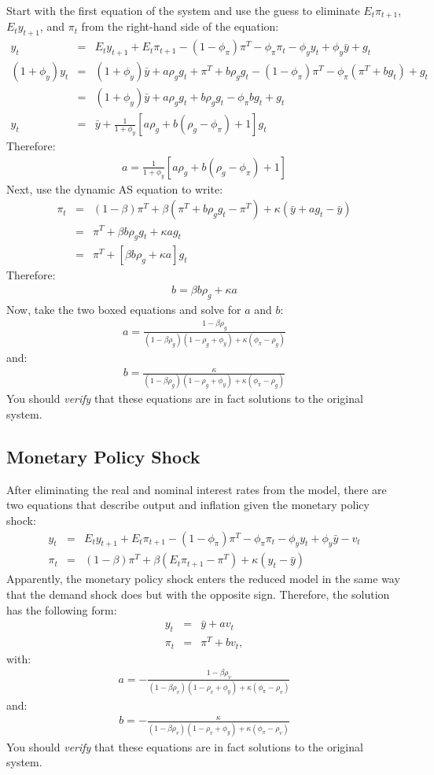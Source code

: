 \documentclass[12pt,fleqn]{article}
\newcommand{\EE}{\begin{eqnarray}}
\newcommand{\FF}{\end{eqnarray}}
\begin{document}
\begin{appendix}
Start with the first equation of the system and use the guess to eliminate $E_t\pi_{t+1}$, $E_ty_{t+1}$, and $\pi_t$ from the right-hand side of the equation:
	\EE
	y_t & = & E_t y_{t+1} + E_t\pi_{t+1}  - (1-\phi_{\pi})\pi^T - \phi_{\pi}\pi_t - \phi_y y_t + \phi_y \bar{y} +  g_t\\
	(1+\phi_y ) y_t & = & (1+\phi_y ) \bar{y} + a \rho_gg_t + \pi^T + b \rho_gg_t - (1-\phi_{\pi})\pi^T - \phi_{\pi}( \pi^T + b g_t) + g_t\\
	& = & (1+\phi_y )\bar{y} + a \rho_gg_t + b \rho_gg_t - \phi_{\pi}b g_t + g_t\\
	y_t & = & \bar{y} + \frac{1}{1+\phi_y }\left[a \rho_g + b (\rho_g - \phi_{\pi}) + 1\right]g_t
	\FF
Therefore:
	\EE
	\boxed{a  =  \frac{1}{1+\phi_y }\left[a \rho_g + b (\rho_g - \phi_{\pi}) + 1\right]}
	\FF
Next, use the dynamic AS equation to write:
	\EE
	\pi_t & = & (1-\beta) \pi^T + \beta \left( \pi^T + b \rho_gg_t - \pi^T\right)  + \kappa (\bar{y} + a g_t -\bar{y})\\
	& = & \pi^T + \beta b \rho_gg_t + \kappa a g_t\\
	& = & \pi^T + \left[ \beta b \rho_g + \kappa a \right]g_t
	\FF
Therefore:
	\EE
	\boxed{b = \beta b \rho_g + \kappa a}
	\FF
Now, take the two boxed equations and solve for $a$ and $b$:
	\EE
	\boxed{a = \frac{1-\beta\rho_g}{(1-\beta\rho_g)(1-\rho_g+\phi_y)+ \kappa(\phi_{\pi}-\rho_g)} }
	\FF
	and:
	\EE
	\boxed{b = \frac{\kappa}{(1-\beta\rho_g)(1-\rho_g+\phi_y)+ \kappa(\phi_{\pi}-\rho_g)}}
	\FF
You should \emph{verify} that these equations are in fact solutions to the original system.

\subsection{Monetary Policy Shock}
\label{sec:solution_monetary_policy}

After eliminating the real and nominal interest rates from the model, there are two equations that describe output and inflation given the monetary policy shock:
	\EE
	y_t & = & E_t y_{t+1} + E_t\pi_{t+1}  - (1-\phi_{\pi})\pi^T - \phi_{\pi}\pi_t - \phi_y y_t + \phi_y \bar{y} - v_t\\
	\pi_t & = & (1-\beta) \pi^T + \beta \left( E_t\pi_{t+1} - \pi^T\right)  + \kappa (y_t -\bar{y})
	\FF
Apparently, the monetary policy shock enters the reduced model in the same way that the demand shock does but with the opposite sign. Therefore, the solution has the following form:
	\EE
	y_t & = & \bar{y} + a v_t\\
	\pi_t & = & \pi^T + b v_t,
	\FF
with: 
	\EE
	\boxed{a = -\frac{1-\beta\rho_v}{(1-\beta\rho_v)(1-\rho_v+\phi_y)+ \kappa(\phi_{\pi}-\rho_v)} }
	\FF
	and:
	\EE
	\boxed{b = -\frac{\kappa}{(1-\beta\rho_v)(1-\rho_v+\phi_y)+ \kappa(\phi_{\pi}-\rho_v)}}
	\FF
You should \emph{verify} that these equations are in fact solutions to the original system.


\end{appendix}
\end{document}
